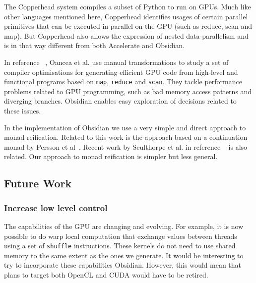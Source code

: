 The Copperhead  system compiles a subset of Python to run 
on GPUs. Much like other languages mentioned here, Copperhead identifies 
usages of certain parallel primitives that can be executed in parallel 
on the GPU (such as reduce, scan and map). But Copperhead also 
allows the expression of nested data-parallelism and is in that 
way different from both Accelerate and Obsidian.   

In reference ~, Oancea et al. use manual transformations
to study a set of 
compiler optimisations for generating efficient GPU code from high-level 
and functional programs based on {\tt map}, {\tt reduce} and {\tt scan}. 
They tackle performance problems related to GPU programming, such as bad 
memory access patterns and diverging branches.
Obsidian enables easy exploration of decisions related to these issues.

In the implementation of Obsidian we use a very simple and direct approach 
to monad reification. Related to this work is the approach based on a 
continuation monad by Persson et al~. Recent work by Sculthorpe et al. in reference ~ is also related. 
Our approach to monad reification is simpler but less general. 

\subsection{Future Work} 
\label{sec:Future}

\subsubsection{Increase low level control} 

The capabilities of the GPU are changing and evolving. For example, it is now 
possible to do warp local computation that exchange values between threads 
using a set of {\tt shuffle} instructions. These kernels do not need to use 
shared memory to the same extent as the ones we generate. It would be interesting 
to try to incorporate these capabilities Obsidian. However, this 
would mean that plans to target both OpenCL and CUDA would have to be retired. 

